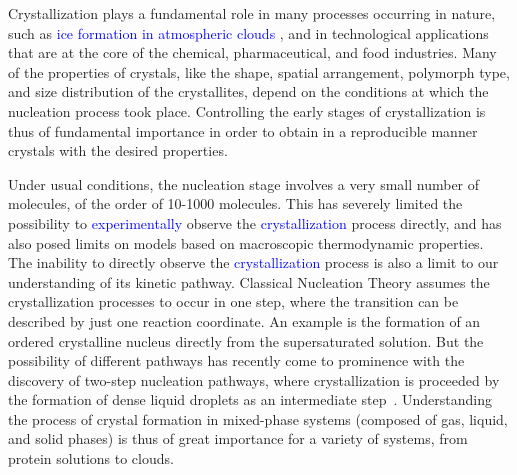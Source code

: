 \documentclass[preprint,amsmath,amssymb,superscriptaddress]{revtex4-1}
\begin{document}
\maketitle


Crystallization plays a fundamental role in many processes occurring in nature, such as \textcolor{blue}{ice formation in atmospheric clouds \cite{glickman2000glossary,morrison2012resilience}}, and in technological applications
that are at the core of the chemical, pharmaceutical, and food industries.
Many of the properties of crystals, like the shape, spatial arrangement, polymorph type, and size distribution of the crystallites, depend on the conditions at which
the nucleation process took place. Controlling the early stages of crystallization is thus of fundamental importance in order to
obtain in a reproducible manner crystals with the desired properties. 

Under usual conditions, the nucleation stage involves a very small number of molecules, of the order of 10-1000 molecules.
This has severely limited the possibility to \textcolor{blue}{experimentally} observe the  \textcolor{blue}{crystallization} process directly, and has also posed limits on models based on macroscopic thermodynamic properties. 
The inability to directly observe the  \textcolor{blue}{crystallization} process is also a limit to our understanding of its kinetic pathway. 
Classical Nucleation Theory assumes the crystallization processes to occur in one step,
where the transition can be described by just one reaction coordinate. An example is the formation of an ordered crystalline nucleus
directly from the supersaturated solution. But the possibility of different pathways has recently come to prominence with
the discovery of two-step nucleation pathways, where crystallization is proceeded by the formation of dense liquid  droplets as an intermediate step~\cite{ten1997enhancement,SearR,savage2009experimental,vekilov2010two,palberg2014crystallization}.
Understanding the process of crystal formation in mixed-phase systems (composed of gas, liquid, and solid phases) is thus
of great importance for a variety of systems, from protein solutions to clouds. 
\end{document}
